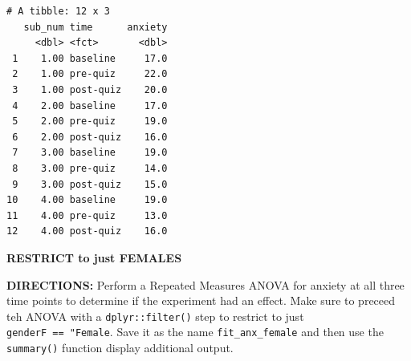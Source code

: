 \documentclass[]{article}
\newenvironment{Shaded}{\begin{snugshade}}{\end{snugshade}}
\newcommand{\KeywordTok}[1]{\textcolor[rgb]{0.13,0.29,0.53}{\textbf{#1}}}
\newcommand{\DataTypeTok}[1]{\textcolor[rgb]{0.13,0.29,0.53}{#1}}
\newcommand{\DecValTok}[1]{\textcolor[rgb]{0.00,0.00,0.81}{#1}}
\newcommand{\StringTok}[1]{\textcolor[rgb]{0.31,0.60,0.02}{#1}}
\newcommand{\CommentTok}[1]{\textcolor[rgb]{0.56,0.35,0.01}{\textit{#1}}}
\newcommand{\OperatorTok}[1]{\textcolor[rgb]{0.81,0.36,0.00}{\textbf{#1}}}
\newcommand{\NormalTok}[1]{#1}
\begin{document}
\begin{Shaded}
\end{Shaded}

\begin{verbatim}
# A tibble: 12 x 3
   sub_num time      anxiety
     <dbl> <fct>       <dbl>
 1    1.00 baseline     17.0
 2    1.00 pre-quiz     22.0
 3    1.00 post-quiz    20.0
 4    2.00 baseline     17.0
 5    2.00 pre-quiz     19.0
 6    2.00 post-quiz    16.0
 7    3.00 baseline     19.0
 8    3.00 pre-quiz     14.0
 9    3.00 post-quiz    15.0
10    4.00 baseline     19.0
11    4.00 pre-quiz     13.0
12    4.00 post-quiz    16.0
\end{verbatim}

\clearpage

\textbf{RESTRICT to just FEMALES}

\textbf{DIRECTIONS:} Perform a Repeated Measures ANOVA for anxiety at
all three time points to determine if the experiment had an effect. Make
sure to preceed teh ANOVA with a \texttt{dplyr::filter()} step to
restrict to just \texttt{genderF\ ==\ "Female}. Save it as the name
\texttt{fit\_anx\_female} and then use the \texttt{summary()} function
display additional output.

\begin{Shaded}
\end{Shaded}
\end{document}
